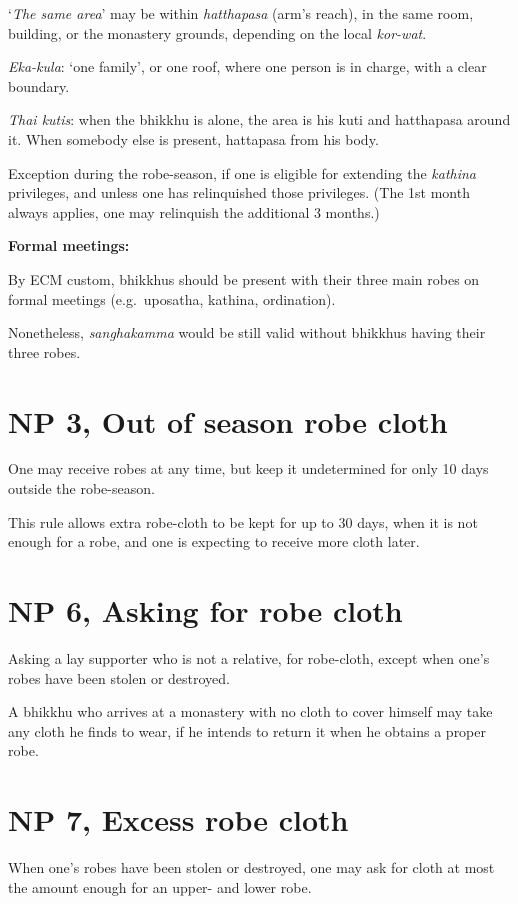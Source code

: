 `\emph{The same area}' may be within \emph{hatthapasa} (arm's reach), in
the same room, building, or the monastery grounds, depending on the
local \emph{kor-wat}.

\emph{Eka-kula}: `one family', or one roof, where one person is in
charge, with a clear boundary.

\emph{Thai kutis}: when the bhikkhu is alone, the area is his kuti and
hatthapasa around it. When somebody else is present, hattapasa from his
body.

Exception during the robe-season, if one is eligible for extending the
\emph{kathina} privileges, and unless one has relinquished those
privileges. (The 1st month always applies, one may relinquish the
additional 3 months.)

\textbf{Formal meetings:}

By ECM custom, bhikkhus should be present with their three main robes on
formal meetings (e.g.~uposatha, kathina, ordination).

Nonetheless, \emph{sanghakamma} would be still valid without bhikkhus
having their three robes.

\section{NP 3, Out of season robe cloth}

One may receive robes at any time, but keep it undetermined for only 10
days outside the robe-season.

This rule allows extra robe-cloth to be kept for up to 30 days, when it
is not enough for a robe, and one is expecting to receive more cloth
later.

\section{NP 6, Asking for robe cloth}

Asking a lay supporter who is not a relative, for robe-cloth, except
when one's robes have been stolen or destroyed.

A bhikkhu who arrives at a monastery with no cloth to cover himself may
take any cloth he finds to wear, if he intends to return it when he
obtains a proper robe.

\section{NP 7, Excess robe cloth}

When one's robes have been stolen or destroyed, one may ask for cloth at
most the amount enough for an upper- and lower robe.

